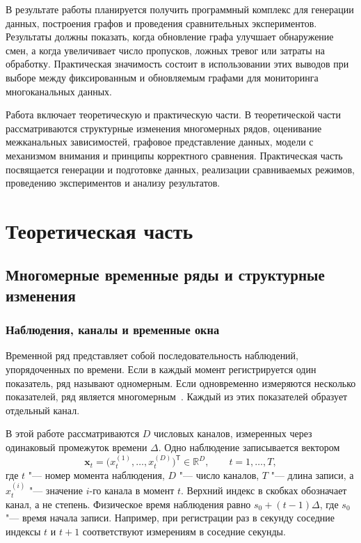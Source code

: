 \documentclass[bachelor, och, diploma]{SCWorks}
\begin{document}
В результате работы планируется получить программный комплекс для генерации данных, построения графов и проведения сравнительных экспериментов. Результаты должны показать, когда обновление графа улучшает обнаружение смен, а когда увеличивает число пропусков, ложных тревог или затраты на обработку. Практическая значимость состоит в использовании этих выводов при выборе между фиксированным и обновляемым графами для мониторинга многоканальных данных.

Работа включает теоретическую и практическую части. В теоретической части рассматриваются структурные изменения многомерных рядов, оценивание межканальных зависимостей, графовое представление данных, модели с механизмом внимания и принципы корректного сравнения. Практическая часть посвящается генерации и подготовке данных, реализации сравниваемых режимов, проведению экспериментов и анализу результатов.


\section{Теоретическая часть}

\subsection{Многомерные временные ряды и структурные изменения}

\subsubsection{Наблюдения, каналы и временные окна}

Временной ряд представляет собой последовательность наблюдений, упорядоченных по времени. Если в каждый момент регистрируется один показатель, ряд называют одномерным. Если одновременно измеряются несколько показателей, ряд является многомерным~\cite{jin2024gnn4ts}. Каждый из этих показателей образует отдельный канал.

В этой работе рассматриваются $D$ числовых каналов, измеренных через одинаковый промежуток времени $\Delta$. Одно наблюдение записывается вектором
\begin{equation}
    \mathbf{x}_t = \bigl(x_t^{(1)},\ldots,x_t^{(D)}\bigr)^{\mathsf T}
    \in \mathbb{R}^{D}, \qquad t=1,\ldots,T,
    \label{eq:mvts-observation}
\end{equation}
где $t$ "--- номер момента наблюдения, $D$ "--- число каналов, $T$ "--- длина записи, а $x_t^{(i)}$ "--- значение $i$-го канала в момент $t$. Верхний индекс в скобках обозначает канал, а не степень. Физическое время наблюдения равно $s_0+(t-1)\Delta$, где $s_0$ "--- время начала записи. Например, при регистрации раз в секунду соседние индексы $t$ и $t+1$ соответствуют измерениям в соседние секунды.
\end{document}

